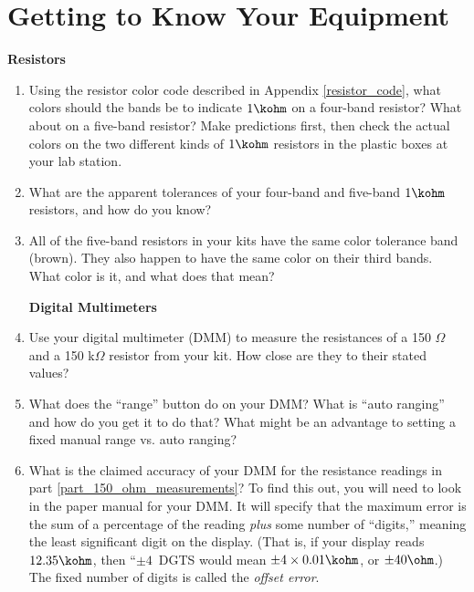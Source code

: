 \section{Getting to Know Your Equipment}
\label{lab_equipment}


\bigskip

\textbf{Resistors}
\begin{enumerate}[wide]

\item Using the resistor color code described in Appendix \ref{resistor_code}, what colors should the bands be to indicate $1\kohm$ on a four-band resistor?  What about on a five-band resistor?  Make predictions first, then check  the actual colors on the two different kinds of $1\kohm$ resistors in the plastic boxes at your lab station.

\item What are the apparent tolerances of your four-band and five-band $1\kohm$ resistors, and how do you know?

\item All of the five-band resistors in your kits have the same color tolerance band (brown).  They also happen to have the same color on their third bands.  What color is it, and what does that mean?
 
\bigskip
\textbf{Digital Multimeters}

\item \label{part_150_ohm_measurements} Use your digital multimeter (DMM) to measure the resistances of a 150 $\Omega$ and a 150 k$\Omega$ resistor from your kit.  How close are they to their stated values?   

\item What does the ``range'' button do on your DMM?  What is ``auto ranging'' and how do you get it to do that?  What might be an advantage to setting a fixed manual range vs. auto ranging?

\item What is the claimed accuracy of your DMM for the resistance readings in part \ref{part_150_ohm_measurements}?  To find this out, you will need to look in the paper manual for your DMM.  It will specify that the maximum error is the sum of a percentage of the reading \textit{plus} some number of ``digits,'' meaning the least significant digit on the display.  (That is, if your display reads $12.35\kohm$, then ``$\pm 4$~DGTS would mean $\pm 4 \times 0.01\kohm$, or $\pm 40\ohm$.)   The fixed number of digits is called the \textit{offset error}.


\end{enumerate}
